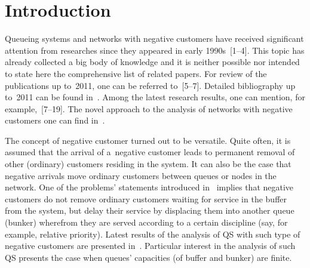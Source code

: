

\vspace*{6pt}



      \thispagestyle{myheadings}

      \begin{multicols}{2}

                  \label{st\stat}


\section{Introduction}

\noindent
Queueing systems and networks with negative customers have received
significant attention from researches since they appeared in
early 1990s~[1--4].
This topic has already collected a big body of knowledge
and it is neither possible nor intended to state here
the comprehensive list of related papers.
For review of the publications up to~2011, one
can be referred to~[5--7].
Detailed bibliography up to~2011 can be found in~\cite{tien}.
Among the latest research results, one can mention, 
for example,~[7--19]. %
The novel approach to the analysis of networks with negative customers one
can find in~\cite{z1, z2}.

The concept of negative customer turned out to be versatile.
Quite often, it is assumed that the arrival of a~negative customer leads to
permanent removal of other (ordinary) customers residing
in the system. It can also be the case that 
negative arrivals move ordinary customers
between queues or nodes in the network.
One of the problems' statements introduced in~\cite{ros-cas} implies that negative
customers do not remove ordinary customers
waiting for service in the buffer 
from the system, but delay their service by
displacing them into another queue (bunker)
wherefrom they are served according to a certain discipline
(say, for example, relative priority).
Latest results of the analysis of QS with such type of
negative customers are presented in~\cite{new8, new7, new9, mikl}.
Particular interest in the analysis of
such QS presents the case
when queues' capacities (of buffer and bunker) are finite.
{

}


\end{multicols}
